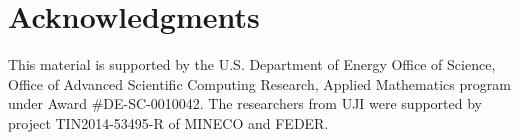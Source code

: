 \section*{Acknowledgments}
This material is supported by the U.S. Department
of Energy Office of Science, Office of Advanced Scientific Computing
Research, Applied Mathematics program under Award
\#DE-SC-0010042.  
The researchers from UJI were supported by project TIN2014-53495-R
of MINECO and FEDER.
